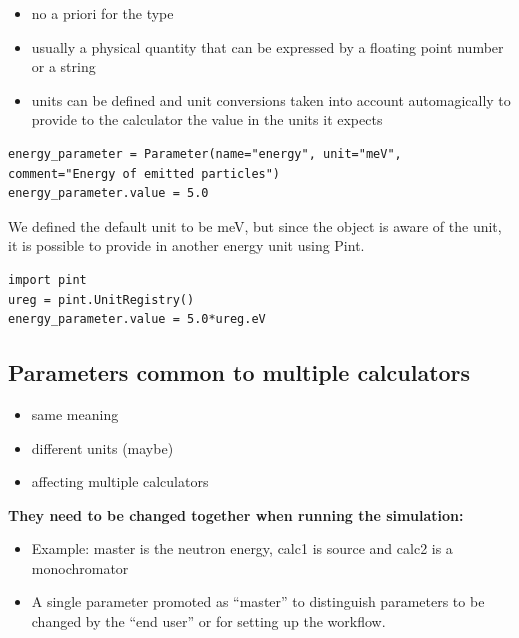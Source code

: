 \documentclass[11pt, a4paper]{article}
\begin{document}
  \begin{itemize}
  \item no a priori for the type
  \item usually a physical quantity that can be expressed by a floating point number or a string
    
  \item units can be defined and unit conversions taken into account automagically to provide to the calculator the value in the units it expects
  \end{itemize}
    \begin{lstlisting}
energy_parameter = Parameter(name="energy", unit="meV", comment="Energy of emitted particles")
energy_parameter.value = 5.0
    \end{lstlisting}
  
  We defined the default unit to be meV, but since the object is aware of the unit, it is possible to provide in another energy unit using Pint.
  \begin{lstlisting}
import pint
ureg = pint.UnitRegistry()
energy_parameter.value = 5.0*ureg.eV
  \end{lstlisting}

\subsection{Parameters common to multiple calculators}

  \begin{itemize}
  \item same meaning
  \item different units (maybe)
  \item affecting multiple calculators
  \end{itemize}

 \textbf{ They need to be changed together when running the simulation:
 }


    \begin{itemize}
    \item Example: master is the neutron energy, calc1 is source and calc2 is a monochromator
      
    \item A single parameter promoted as ``master'' to distinguish parameters to be changed by the ``end user'' or for setting up the workflow.
    \end{itemize}
  
\end{document}
